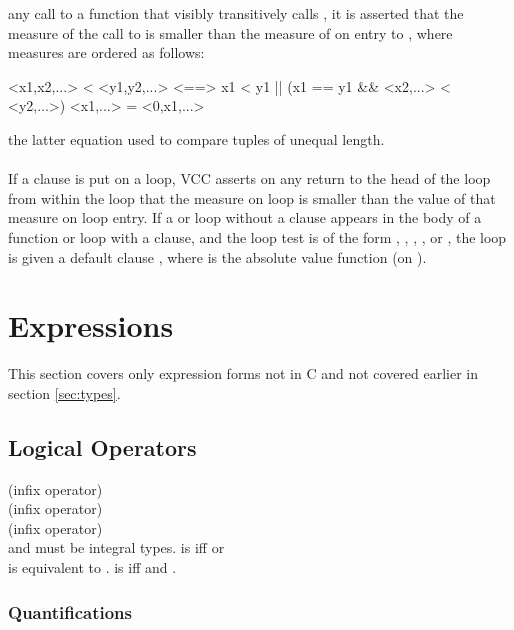 \documentclass[preprint,nocopyrightspace]{sigplanconf}
\begin{document}
{{{any call to a function  that visibly transitively calls ,
it is asserted that the measure of the call to  is smaller
than the measure of  on entry to , where measures are
ordered as follows:
\begin{VCC}
<x1,x2,...> < <y1,y2,...> <==> x1 < y1 || (x1 == y1 && <x2,...> < <y2,...>)
<x1,...> = <0,x1,...>
\end{VCC}
the latter equation used to compare tuples of unequal length.
\\\\
If a  clause is put on a loop, VCC asserts on any
return to the head of the loop from within the loop that the measure
on loop is smaller than the value of that measure on loop entry. If a
 or  loop without a  clause appears in the body of a function
or loop with a  clause, and the loop test is of the
form , , , ,
or , the loop is given a default clause 
, where  is the absolute value function
(on \vcc{\integer}). 

\section{Expressions}
This section covers only expression forms not in C and not covered
earlier in section \ref{sec:types}.

\subsection{Logical Operators}

 (infix operator) \\
 (infix operator)\\
 (infix operator)\\
 and  must be integral types. 
 is \vcc{\true} iff  or \\
 is equivalent to .
 is \vcc{\true} iff  and .

\subsubsection{Quantifications}

}}}
\end{document}
